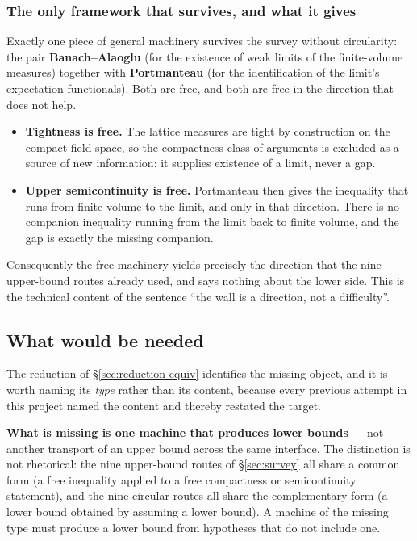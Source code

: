 \subsubsection*{The only framework that survives, and what it gives}

Exactly one piece of general machinery survives the survey without circularity: the pair
\textbf{Banach--Alaoglu} (for the existence of weak limits of the finite-volume measures) together
with \textbf{Portmanteau} (for the identification of the limit's expectation functionals). Both
are free, and both are free in the direction that does not help.

\begin{itemize}
\item \textbf{Tightness is free.} The lattice measures are tight by construction on the compact
field space, so the compactness class of arguments is excluded as a source of new information: it
supplies existence of a limit, never a gap.
\item \textbf{Upper semicontinuity is free.} Portmanteau then gives the inequality that runs from
finite volume to the limit, and only in that direction. There is no companion inequality running
from the limit back to finite volume, and the gap is exactly the missing companion.
\end{itemize}

\noindent Consequently the free machinery yields precisely the direction that the nine upper-bound
routes already used, and says nothing about the lower side. This is the technical content of the
sentence ``the wall is a direction, not a difficulty''.

\subsection{What would be needed}
\label{sec:verdict-needed}

The reduction of \S\ref{sec:reduction-equiv} identifies the missing object, and it is worth naming
its \emph{type} rather than its content, because every previous attempt in this project named the
content and thereby restated the target.

\begin{qbox}
\textbf{What is missing is one machine that produces lower bounds} --- not another transport of an
upper bound across the same interface. The distinction is not rhetorical: the nine upper-bound
routes of \S\ref{sec:survey} all share a common form (a free inequality applied to a free
compactness or semicontinuity statement), and the nine circular routes all share the complementary
form (a lower bound obtained by assuming a lower bound). A machine of the missing type must produce
a lower bound from hypotheses that do not include one.
\end{qbox}

